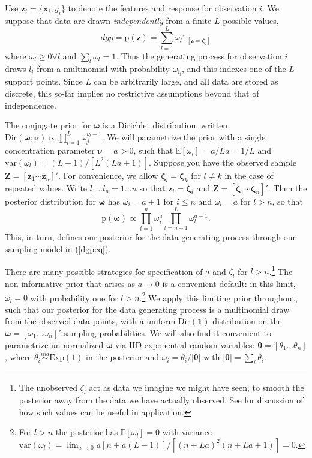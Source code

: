 \documentclass{article}
\begin{document}
Use $\mathbf{z}_i = \{\mathbf{x}_i,y_i\}$ to denote the  features
and response  for observation $i$. We suppose that data are drawn
\emph{independently} from a finite  $L$  possible values,
\begin{equation}\label{dgpeq}
dgp = \mathrm{p}(\mathbf{z}) = \sum_{l=1}^L \omega_l \mathds{1}_{[\mathbf{z} = \boldsymbol{\zeta}_l]}
\end{equation}
where $\omega_l\geq0\forall l$ and $\sum_l \omega_l = 1$. Thus the
generating process for observation $i$ draws $l_i$ from a multinomial
with probability $\omega_{l_i}$, and this indexes one of the $L$ support
points. Since $L$ can be arbitrarily large, and all data are stored as
discrete, this so-far implies no restrictive
assumptions beyond that of independence.

The conjugate prior for $\boldsymbol{\omega}$ is a Dirichlet
distribution, written
$\mathrm{Dir}(\boldsymbol{\omega}; \boldsymbol{\nu}) \propto \prod_{l=1}^L\omega_j^{\nu_l-1}$.
We will parametrize the prior with a single concentration parameter
$\boldsymbol{\nu} = a >0$, such that $\mathbb{E}[\omega_l] = a/La = 1/L$
and $\mathrm{var}(\omega_l) = (L-1)/[L^2(La+1)]$. Suppose you have the
observed sample $\mathbf{Z} = [\mathbf{z}_1 \cdots \mathbf{z}_n]'$. For
convenience, we allow $\boldsymbol{\zeta}_l=\boldsymbol{\zeta}_k$ for
$l \neq k$ in the case of repeated values. Write
$l_1 \dots l_n = 1 \dots n$ so that
$\mathbf{z}_i = \boldsymbol{\zeta}_i$ and
$\mathbf{Z} = [\boldsymbol{\zeta}_1 \cdots \boldsymbol{\zeta}_n]'$. Then
the posterior distribution for $\boldsymbol{\omega}$ has
$\omega_i = a+1$ for $i\leq n$ and $\omega_l = a$ for $l>n$, so that
\begin{equation}\label{omegapost}
\mathrm{p}(\boldsymbol{\omega}) \propto \prod_{i=1}^n \omega_i^{a} \prod_{l=n+1}^L \omega_l^{a-1}.
\end{equation}
This, in turn, defines our posterior for the data generating process
through our sampling model in (\ref{dgpeq}).

There are many possible strategies for specification of $a$ and
$\zeta_l$ for $l>n$.\footnote{The unobserved $\zeta_l$ act as data we imagine we
might have seen, to smooth the posterior away from the data we have
actually observed. See \cite{poirier_bayesian_2011} for discussion of
how such values can be useful in application.} The non-informative prior
that arises as $a\rightarrow 0$ is a convenient default: in this limit, $\omega_l = 0$ with probability one for
$l>n$.\footnote{For $l>n$ the posterior has
$\mathbb{E}[\omega_l]=0$ with variance
$\mathrm{var}(\omega_l) = \lim_{a \to 0} a[n+a(L-1)]/[(n+La)^2(n+La+1)] = 0$.}
We apply this limiting prior throughout, such that our posterior for the
data generating process is a multinomial draw from the observed
data points, with a uniform $\mathrm{Dir}(\boldsymbol{1})$ distribution
on the $\boldsymbol{\omega} = [\omega_1 \dots \omega_n]'$ sampling
probabilities.  We will also find it convenient to parametrize un-normalized $\boldsymbol{\omega}$ via
IID exponential random variables: $\boldsymbol{\theta} = [\theta_1 \dots \theta_n]$, where $\theta_i \stackrel{ind}{\sim} \mathrm{Exp}(1)$ in the posterior and $\omega_i = \theta_i/|\boldsymbol{\theta}|$ with $|\boldsymbol{\theta}| = \sum_i \theta_i$.
\end{document}
